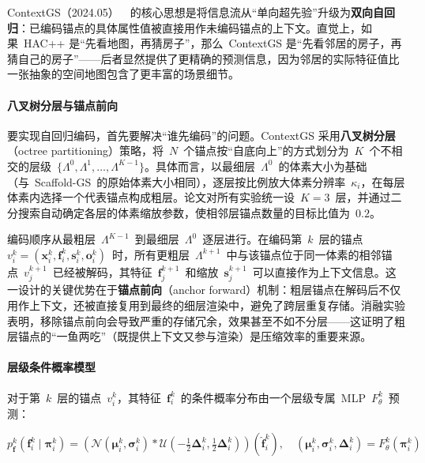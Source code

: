 ContextGS（2024.05）~\cite{2405_20721}~的核心思想是将信息流从``单向超先验''升级为\textbf{双向自回归}：已编码锚点的具体属性值被直接用作未编码锚点的上下文。直觉上，如果~HAC++ 是``先看地图，再猜房子''，那么~ContextGS 是``先看邻居的房子，再猜自己的房子''——后者显然提供了更精确的预测信息，因为邻居的实际特征值比一张抽象的空间地图包含了更丰富的场景细节。

\paragraph{八叉树分层与锚点前向}

要实现自回归编码，首先要解决``谁先编码''的问题。ContextGS 采用\textbf{八叉树分层}（octree partitioning）策略，将~$N$~个锚点按``自底向上''的方式划分为~$K$~个不相交的层级~$\{\Lambda^0, \Lambda^1, \ldots, \Lambda^{K-1}\}$。具体而言，以最细层~$\Lambda^0$~的体素大小为基础（与~Scaffold-GS~的原始体素大小相同），逐层按比例放大体素分辨率~$\kappa_i$，在每层体素内选择一个代表锚点构成粗层。论文对所有实验统一设~$K=3$~层，并通过二分搜索自动确定各层的体素缩放参数，使相邻层锚点数量的目标比值为~$0.2$。

编码顺序从最粗层~$\Lambda^{K-1}$~到最细层~$\Lambda^0$~逐层进行。在编码第~$k$~层的锚点~$v_i^k = (\mathbf{x}_i^k, \mathbf{f}_i^k, \mathbf{s}_i^k, \mathbf{o}_i^k)$~时，所有更粗层~$\Lambda^{k+1}$~中与该锚点位于同一体素的相邻锚点~$v_j^{k+1}$~已经被解码，其特征~$\mathbf{f}_j^{k+1}$~和缩放~$\mathbf{s}_j^{k+1}$~可以直接作为上下文信息。这一设计的关键优势在于\textbf{锚点前向}（anchor forward）机制：粗层锚点在解码后不仅用作上下文，还被直接复用到最终的细层渲染中，避免了跨层重复存储。消融实验表明，移除锚点前向会导致严重的存储冗余，效果甚至不如不分层——这证明了粗层锚点的``一鱼两吃''（既提供上下文又参与渲染）是压缩效率的重要来源。

\paragraph{层级条件概率模型}

对于第~$k$~层的锚点~$v_i^k$，其特征~$\mathbf{f}_i^k$~的条件概率分布由一个层级专属~MLP~$F_\theta^k$~预测：

\begin{equation}
p_{\mathbf{f}}^k(\mathbf{f}_i^k \mid \boldsymbol{\pi}_i^k) = \left(\mathcal{N}(\boldsymbol{\mu}_i^k, \boldsymbol{\sigma}_i^k) * \mathcal{U}(-\tfrac{1}{2}\boldsymbol{\Delta}_i^k, \tfrac{1}{2}\boldsymbol{\Delta}_i^k)\right)(\hat{\mathbf{f}}_i^k), \quad (\boldsymbol{\mu}_i^k, \boldsymbol{\sigma}_i^k, \boldsymbol{\Delta}_i^k) = F_\theta^k(\boldsymbol{\pi}_i^k)
\end{equation}

